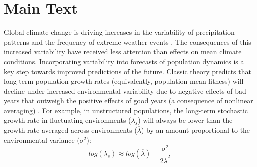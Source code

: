 \documentclass[12pt]{article}
\begin{document}

\section*{Main Text}

Global climate change is driving increases in the variability of precipitation patterns and the frequency of extreme weather events \cite{IPCC2012managing,seneviratne2012changes,stocker2013technical}. 
The consequences of this increased variability have received less attention than effects on mean climate conditions. 
Incorporating variability into forecasts of population dynamics is a key step towards improved predictions of the future.
Classic theory predicts that long-term population growth rates (equivalently, population mean fitness) will decline under increased environmental variability due to negative effects of bad years that outweigh the positive effects of good years (a consequence of nonlinear averaging) \cite{lewontin_population_1969,tuljapurkar_population_1982}.
For example, in unstructured populations, the long-term stochastic growth rate in fluctuating environments ($\lambda_s$) will always be lower than the growth rate averaged across environments ($\overline{\lambda}$) by an amount proportional to the environmental variance ($\sigma^2$): 
\begin{equation}
	 log(\lambda_s)  \approx log(\overline{\lambda}) - \frac{\sigma^2}{2\overline{\lambda}^2}
\end{equation}
\end{document}
